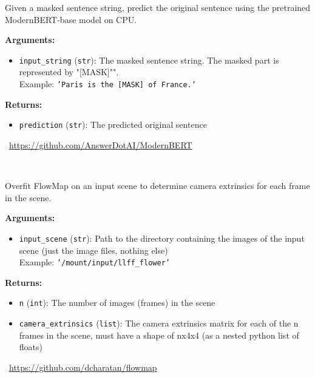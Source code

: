 \begin{tcolorbox}[title={\texttt{modernbert\_predict\_masked}}]
Given a masked sentence string, predict the original sentence using the pretrained ModernBERT-base model on CPU.

\vspace{.5em}
\textbf{Arguments:}
\begin{itemize}[topsep=0pt,parsep=-1pt,partopsep=0pt]
\item \texttt{input\_string} (\texttt{str}): The masked sentence string. The masked part is represented by "[MASK]"".\\  Example: \texttt{'Paris is the [MASK] of France.'}
\end{itemize}

\vspace{.5em}
\textbf{Returns:} \begin{itemize}[topsep=0pt,parsep=-1pt,partopsep=0pt]
\item \texttt{prediction} (\texttt{str}): The predicted original sentence
\end{itemize}
\tcblower
\setlength{\hangindent}{\widthof{\faGithub~}}
\faGithub~\url{https://github.com/AnswerDotAI/ModernBERT}

\vspace{.5em}\setlength{\hangindent}{\widthof{\faFile*[regular]~}}\faFile*[regular]~


\end{tcolorbox}

\label{app:tasks:3d_vision}
\begin{tcolorbox}[title={\texttt{flowmap\_overfit\_scene}}]
Overfit FlowMap on an input scene to determine camera extrinsics for each frame in the scene.

\vspace{.5em}
\textbf{Arguments:}
\begin{itemize}[topsep=0pt,parsep=-1pt,partopsep=0pt]
\item \texttt{input\_scene} (\texttt{str}): Path to the directory containing the images of the input scene (just the image files, nothing else)\\  Example: \texttt{'/mount/input/llff\_flower'}
\end{itemize}

\vspace{.5em}
\textbf{Returns:} \begin{itemize}[topsep=0pt,parsep=-1pt,partopsep=0pt]
\item \texttt{n} (\texttt{int}): The number of images (frames) in the scene
\item \texttt{camera\_extrinsics} (\texttt{list}): The camera extrinsics matrix for each of the n frames in the scene, must have a shape of nx4x4 (as a nested python list of floats)
\end{itemize}
\tcblower
\setlength{\hangindent}{\widthof{\faGithub~}}
\faGithub~\url{https://github.com/dcharatan/flowmap}

\vspace{.5em}\setlength{\hangindent}{\widthof{\faFile*[regular]~}}\faFile*[regular]~


\end{tcolorbox}

